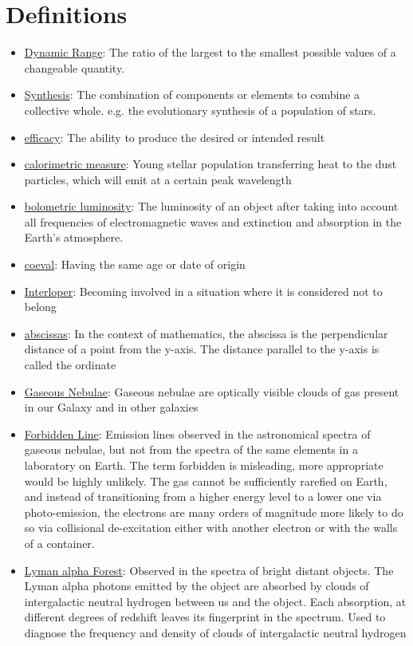 \documentclass{literature}
\begin{document}
\section{Definitions}
\begin{itemize}
\item \underline{Dynamic Range}: The ratio of the largest to the smallest possible values of a changeable quantity.
\item \underline{Synthesis}: The combination of components or elements to combine a collective whole. e.g. the evolutionary synthesis of a population of stars.
\item \underline{efficacy}: The ability to produce the desired or intended result
\item \underline{calorimetric measure}: Young stellar population transferring heat to the dust particles, which will emit at a certain peak wavelength
\item \underline{bolometric luminosity}: The luminosity of an object after taking into account all frequencies of electromagnetic waves and extinction and absorption in the Earth's atmosphere.
\item \underline{coeval}: Having the same age or date of origin
\item \underline{Interloper}: Becoming involved in a situation where it is considered not to belong	
\item \underline{abscissas}: In the context of mathematics, the abscissa is the perpendicular distance of a point from the y-axis. The distance parallel to the y-axis is called the ordinate
\item \underline{Gaseous Nebulae}: Gaseous nebulae are optically visible clouds of gas present in our Galaxy and in other galaxies
\item \underline{Forbidden Line}: Emission lines observed in the astronomical spectra of gaseous nebulae, but not from the spectra of the same elements in a laboratory on Earth. The term forbidden is misleading, more appropriate would be highly unlikely. The gas cannot be sufficiently rarefied on Earth, and instead of transitioning from a higher energy level to a lower one via photo-emission, the electrons are many orders of magnitude more likely to do so via collisional de-excitation either with another electron or with the walls of a container.
\item \underline{Lyman alpha Forest}: Observed in the spectra of bright distant objects. The Lyman alpha photons emitted by the object are absorbed by clouds of intergalactic neutral hydrogen between us and the object. Each absorption, at different degrees of redshift leaves its fingerprint in the spectrum. Used to diagnose the frequency and density of clouds of intergalactic neutral hydrogen

\end{itemize}
\end{document}
